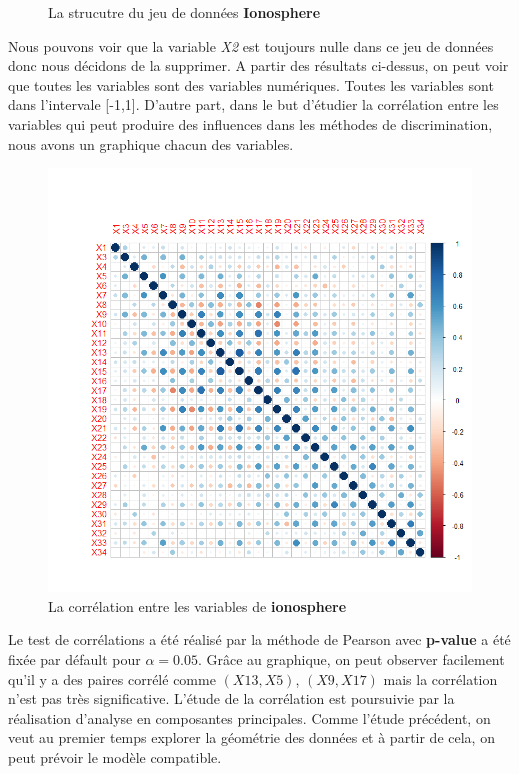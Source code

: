 \documentclass[a4paper,11pt,oneside,roman]{article}
\begin{document}
\begin{figure}[htb]
\begin{tabular}{cc}
    \end{tabular}
    \caption{La strucutre du jeu de données \textbf{Ionosphere}}
    \label{fig:my_label}
\end{figure}
Nous pouvons voir que la variable \textit{X2} est toujours nulle dans ce jeu de données donc nous décidons de la supprimer. A partir des résultats ci-dessus, on peut voir que toutes les variables sont des variables numériques. Toutes les variables sont dans l'intervale [-1,1]. D'autre part, dans le but d'étudier la corrélation entre les variables qui peut produire des influences dans les méthodes de discrimination, nous avons un graphique chacun des variables. \newline
\begin{figure}[htb]
    \centering
    \includegraphics[scale = .4]{./discrimination/ionosphere/corrplot.png} 
    \caption{La corrélation entre les variables de \textbf{ionosphere}}
    \label{fig:my_label}
\end{figure}
Le test de corrélations a été réalisé par la méthode de Pearson avec \textbf{p-value} a été fixée par défault pour $\alpha = 0.05$. Grâce au graphique, on peut observer facilement qu'il y a des paires corrélé  comme $(X13,X5)$, $(X9,X17)$ mais la corrélation n'est pas très significative. L'étude de la corrélation est poursuivie par la réalisation d'analyse en composantes principales. Comme l'étude précédent, on veut au premier temps explorer la géométrie des données et à partir de cela, on peut prévoir le modèle compatible. \newline
\end{document}
